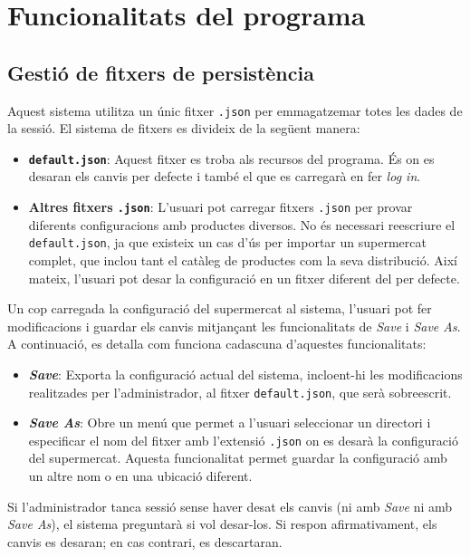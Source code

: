 \documentclass[a4paper,12pt]{article}
\begin{document}
	\newpage
	\section{Funcionalitats del programa}
	
	\subsection{Gestió de fitxers de persistència}

	Aquest sistema utilitza un únic fitxer \texttt{.json} per emmagatzemar totes les dades de la sessió. El sistema de fitxers es divideix de la següent manera:
	
	\begin{itemize}
		\item \textbf{\texttt{default.json}}: Aquest fitxer es troba als recursos del programa. És on es desaran els canvis per defecte i també el que es carregarà en fer \textit{log in}.
		\item \textbf{Altres fitxers \texttt{.json}}: L'usuari pot carregar fitxers \texttt{.json} per provar diferents configuracions amb productes diversos. No és necessari reescriure el \texttt{default.json}, ja que existeix un cas d'ús per importar un supermercat complet, que inclou tant el catàleg de productes com la seva distribució. Així mateix, l'usuari pot desar la configuració en un fitxer diferent del per defecte.
	\end{itemize}
	
	Un cop carregada la configuració del supermercat al sistema, l'usuari pot fer modificacions i guardar els canvis mitjançant les funcionalitats de \textit{Save} i \textit{Save As}. A continuació, es detalla com funciona cadascuna d'aquestes funcionalitats:
	
	\begin{itemize}
		\item \textbf{\textit{Save}}: Exporta la configuració actual del sistema, incloent-hi les modificacions realitzades per l'administrador, al fitxer \texttt{default.json}, que serà sobreescrit.
		\item \textbf{\textit{Save As}}: Obre un menú que permet a l'usuari seleccionar un directori i especificar el nom del fitxer amb l'extensió \texttt{.json} on es desarà la configuració del supermercat. Aquesta funcionalitat permet guardar la configuració amb un altre nom o en una ubicació diferent.
	\end{itemize}
	
	Si l'administrador tanca sessió sense haver desat els canvis (ni amb \textit{Save} ni amb \textit{Save As}), el sistema preguntarà si vol desar-los. Si respon afirmativament, els canvis es desaran; en cas contrari, es descartaran. \\
	
\end{document}
